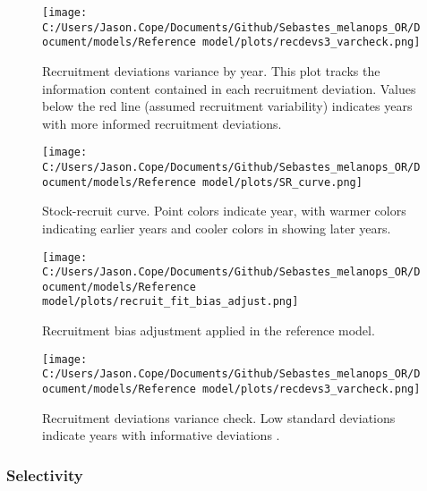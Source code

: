 \documentclass[11pt,
  letterpaper,
]{article}
\begin{document}
\newpage

\begin{figure}
{\centering
\texttt{[image: C:/Users/Jason.Cope/Documents/Github/Sebastes\_melanops\_OR/Document/models/Reference model/plots/recdevs3\_varcheck.png]}
}
\caption{Recruitment deviations variance by year. This plot tracks the information content contained in each recruitment deviation. Values below the red line (assumed recruitment variability) indicates years with more informed recruitment deviations.\label{fig:rec-devs-sigmas}}
\end{figure}

\newpage

\begin{figure}
{\centering
\texttt{[image: C:/Users/Jason.Cope/Documents/Github/Sebastes\_melanops\_OR/Document/models/Reference model/plots/SR\_curve.png]}
}
\caption{Stock-recruit curve. Point colors indicate year, with warmer colors indicating earlier years and cooler colors in showing later years.\label{fig:bh-curve}}
\end{figure}

\newpage

\begin{figure}
{\centering
\texttt{[image: C:/Users/Jason.Cope/Documents/Github/Sebastes\_melanops\_OR/Document/models/Reference model/plots/recruit\_fit\_bias\_adjust.png]}
}
\caption{Recruitment bias adjustment applied in the reference model.\label{fig:bias-adj}}
\end{figure}

\newpage

\begin{figure}
{\centering
\texttt{[image: C:/Users/Jason.Cope/Documents/Github/Sebastes\_melanops\_OR/Document/models/Reference model/plots/recdevs3\_varcheck.png]}
}
\caption{Recruitment deviations variance check. Low standard deviations indicate years with informative deviations .\label{fig:varcheck}}
\end{figure}

\newpage

\hypertarget{selectivity}{%
\subsubsection{Selectivity}\label{selectivity}}
\end{document}
